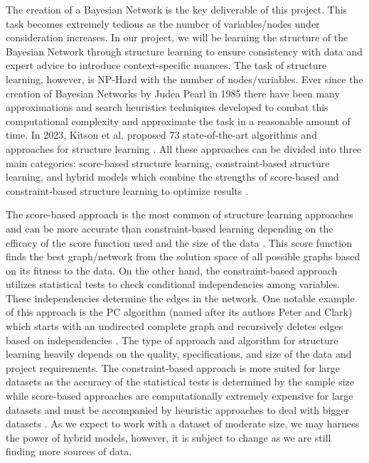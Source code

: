 \documentclass[conference]{IEEEtran}
\begin{document}
The creation of a Bayesian Network is the key deliverable of this project. This task becomes extremely tedious as the number of variables/nodes under consideration increases. In our project, we will be learning the structure of the Bayesian Network through structure learning to ensure consistency with data and expert advice to introduce context-specific nuances. The task of structure learning, however, is NP-Hard with the number of nodes/variables. Ever since the creation of Bayesian Networks by Judea Pearl in 1985 there have been many approximations and search heuristics techniques developed to combat this computational complexity and approximate the task in a reasonable amount of time. In 2023, Kitson et al. proposed 73 state-of-the-art algorithms and approaches for structure learning \cite{kitson2023survey}. All these approaches can be divided into three main categories: score-based structure learning, constraint-based structure learning, and hybrid models which combine the strengths of score-based and constraint-based structure learning to optimize results \cite{kitson2023survey}. 

The score-based approach is the most common of structure learning approaches and can be more accurate than constraint-based learning depending on the efficacy of the score function used and the size of the data \cite{scanagatta2019survey}. This score function finds the best graph/network from the solution space of all possible graphs based on its fitness to the data. On the other hand, the constraint-based approach utilizes statistical tests to check conditional independencies among variables. These independencies determine the edges in the network. One notable example of this approach is the PC algorithm (named after its authors Peter and Clark) which starts with an undirected complete graph and recursively deletes edges based on independencies \cite{scanagatta2019survey}. The type of approach and algorithm for structure learning heavily depends on the quality, specifications, and size of the data and project requirements. The constraint-based approach is more suited for large datasets as the accuracy of the statistical tests is determined by the sample size while score-based approaches are computationally extremely expensive for large datasets and must be accompanied by heuristic approaches to deal with bigger datasets \cite{scanagatta2019survey}. As we expect to work with a dataset of moderate size, we may harness the power of hybrid models, however, it is subject to change as we are still finding more sources of data. 
\end{document}
